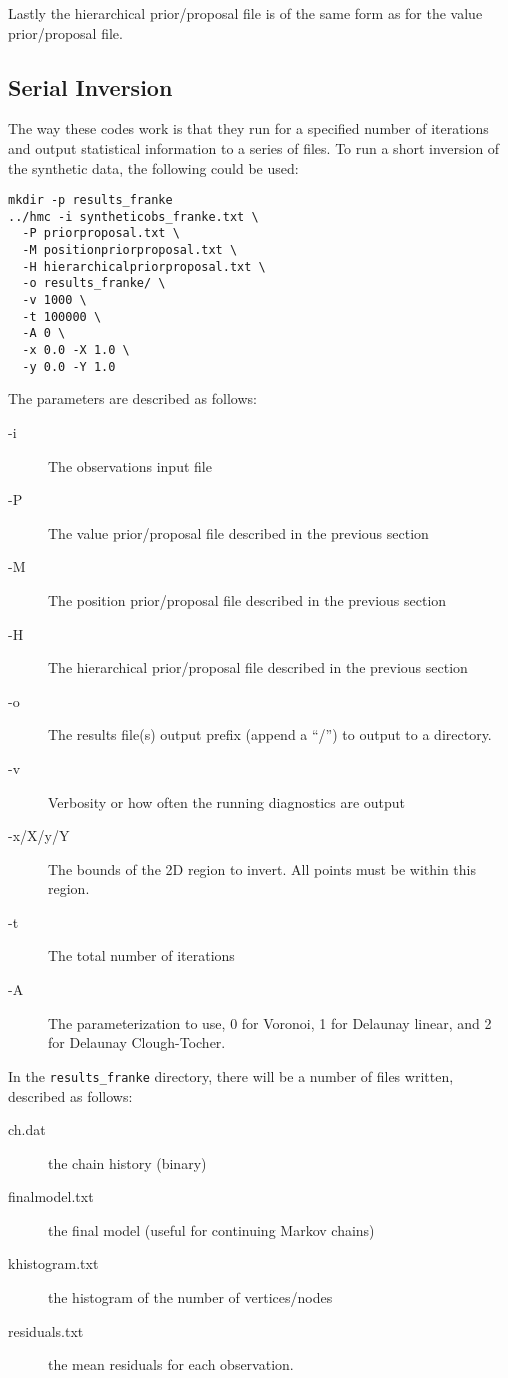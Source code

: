 \documentclass[a4paper,12pt]{article}
\begin{document}
Lastly the hierarchical prior/proposal file is of the same form as for
the value prior/proposal file. 

\subsection{Serial Inversion}

The way these codes work is that they run for a specified number of
iterations and output statistical information to a series of files.
To run a short inversion of the synthetic data, the following
could be used:

\begin{verbatim}
mkdir -p results_franke
../hmc -i syntheticobs_franke.txt \
  -P priorproposal.txt \
  -M positionpriorproposal.txt \
  -H hierarchicalpriorproposal.txt \
  -o results_franke/ \
  -v 1000 \
  -t 100000 \
  -A 0 \
  -x 0.0 -X 1.0 \
  -y 0.0 -Y 1.0
\end{verbatim}

The parameters are described as follows:

\begin{description}
\item [-i] The observations input file
\item [-P] The value prior/proposal file described in the previous section
\item [-M] The position prior/proposal file described in the previous section
\item [-H] The hierarchical prior/proposal file described in the previous section
\item [-o] The results file(s) output prefix (append a ``/'') to output to a
  directory.
\item [-v] Verbosity or how often the running diagnostics are output
\item [-x/X/y/Y] The bounds of the 2D region to invert. All points must be within
  this region.
\item [-t] The total number of iterations
\item [-A] The parameterization to use, 0 for Voronoi, 1 for Delaunay linear, and
  2 for Delaunay Clough-Tocher.
\end{description}

In the {\tt results\_franke} directory, there will be a number of files written,
described as follows:

\begin{description}
\item[ch.dat] the chain history (binary)
\item[finalmodel.txt] the final model (useful for continuing Markov chains)
\item[khistogram.txt] the histogram of the number of vertices/nodes
\item[residuals.txt] the mean residuals for each observation.
\end{description}
\end{document}
